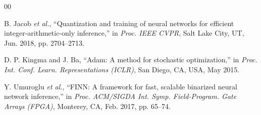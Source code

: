 \documentclass[conference]{IEEEtran}
\begin{document}
\begin{thebibliography}{00}






 B. Jacob \emph{et al.}, ``Quantization and training of neural networks for efficient integer-arithmetic-only inference,'' in \emph{Proc. IEEE CVPR}, Salt Lake City, UT, Jun. 2018, pp. 2704--2713.

 D. P. Kingma and J. Ba, ``Adam: A method for stochastic optimization,'' in \emph{Proc. Int. Conf. Learn. Representations (ICLR)}, San Diego, CA, USA, May 2015.

 Y. Umuroglu \emph{et al.}, ``FINN: A framework for fast, scalable binarized neural network inference,'' in \emph{Proc. ACM/SIGDA Int. Symp. Field-Program. Gate Arrays (FPGA)}, Monterey, CA, Feb. 2017, pp. 65--74.

\end{thebibliography}
\end{document}
